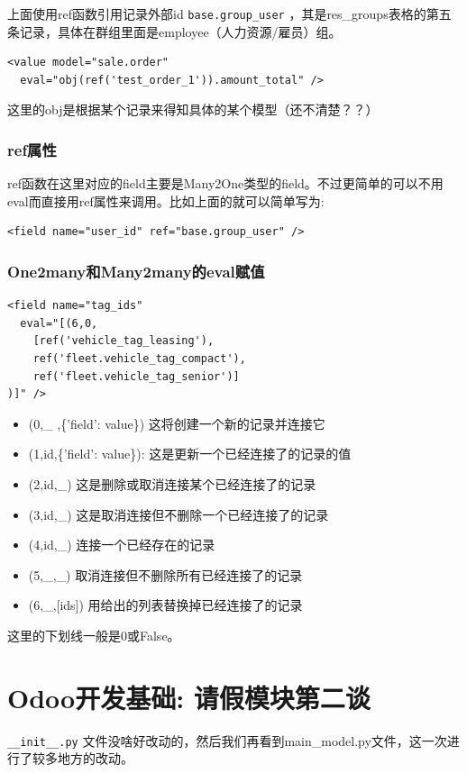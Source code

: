 \documentclass[11pt,a4paper]{sphinxmanual}
\begin{document}
上面使用ref函数引用记录外部id \verb~base.group_user~ ，其是res\_groups表格的第五条记录，具体在群组里面是employee（人力资源/雇员）组。

\begin{Verbatim}
<value model="sale.order"
  eval="obj(ref('test_order_1')).amount_total" />
\end{Verbatim}

这里的obj是根据某个记录来得知具体的某个模型（还不清楚？？）


\subsection{ref属性}
\label{sec-9-5-2}
ref函数在这里对应的field主要是Many2One类型的field。不过更简单的可以不用eval而直接用ref属性来调用。比如上面的就可以简单写为:
\begin{Verbatim}
<field name="user_id" ref="base.group_user" />
\end{Verbatim}

\subsection{One2many和Many2many的eval赋值}
\label{sec-9-5-3}
\begin{Verbatim}
<field name="tag_ids"
  eval="[(6,0,   
    [ref('vehicle_tag_leasing'),
    ref('fleet.vehicle_tag_compact'),
    ref('fleet.vehicle_tag_senior')]
)]" />
\end{Verbatim}


\begin{itemize}
\item (0,\_ ,\{'field': value\})  这将创建一个新的记录并连接它
\item (1,id,\{'field': value\}): 这是更新一个已经连接了的记录的值
\item (2,id,\_) 这是删除或取消连接某个已经连接了的记录
\item (3,id,\_) 这是取消连接但不删除一个已经连接了的记录
\item (4,id,\_) 连接一个已经存在的记录
\item (5,\_,\_) 取消连接但不删除所有已经连接了的记录
\item (6,\_,[ids]) 用给出的列表替换掉已经连接了的记录
\end{itemize}

这里的下划线一般是0或False。





\chapter{Odoo开发基础: 请假模块第二谈}
\label{sec-10}
\verb~__init__.py~ 文件没啥好改动的，然后我们再看到main\_model.py文件，这一次进行了较多地方的改动。
\end{document}
